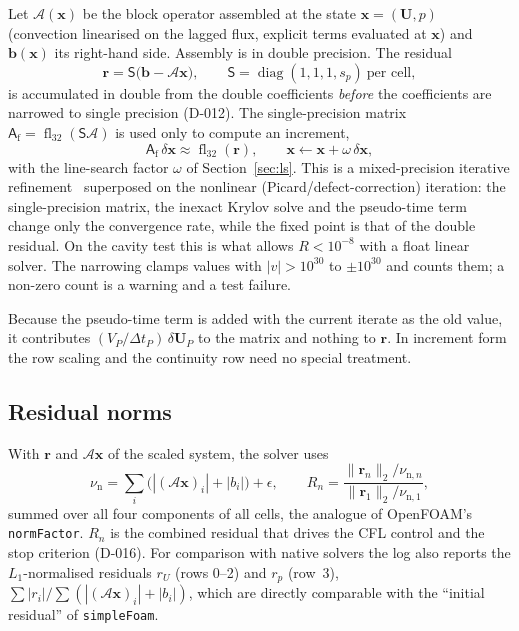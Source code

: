 \documentclass[11pt,a4paper]{article}
\newcommand{\vect}[1]{\mathbf{#1}}
\newcommand{\Uv}{\vect{U}}
\newcommand{\dt}{\Delta t}
\newcommand{\code}[1]{\texttt{#1}}
\begin{document}
Let $\mathcal{A}(\vect x)$ be the block operator assembled at the state
$\vect x=(\Uv,p)$ (convection linearised on the lagged flux, explicit terms
evaluated at $\vect x$) and $\vect b(\vect x)$ its right-hand side. Assembly
is in double precision. The residual
\begin{equation}
  \vect r = \mathsf{S}\bigl(\vect b-\mathcal{A}\vect x\bigr),\qquad
  \mathsf{S}=\operatorname{diag}(1,1,1,s_p)\ \text{per cell},
\end{equation}
is accumulated in double from the double coefficients \emph{before} the
coefficients are narrowed to single precision (D-012). The single-precision
matrix $\mathsf{A}_{\mathrm{f}}=\operatorname{fl}_{32}(\mathsf{S}\mathcal A)$
is used only to compute an increment,
\begin{equation}
  \mathsf{A}_{\mathrm{f}}\,\delta\vect x \approx \operatorname{fl}_{32}(\vect r),
  \qquad
  \vect x\leftarrow\vect x+\omega\,\delta\vect x,
  \label{eq:increment}
\end{equation}
with the line-search factor $\omega$ of Section~\ref{sec:ls}. This is a
mixed-precision iterative refinement~\cite{Baboulin2009,Carson2018}
superposed on the nonlinear (Picard/defect-correction) iteration: the
single-precision matrix, the inexact Krylov solve and the pseudo-time term
change only the convergence rate, while the fixed point is that of the double
residual. On the cavity test this is what allows $R<10^{-8}$ with a float
linear solver. The narrowing clamps values with $|v|>10^{30}$ to
$\pm10^{30}$ and counts them; a non-zero count is a warning and a test
failure.

Because the pseudo-time term is added with the current iterate as the old
value, it contributes $(V_P/\dt_P)\,\delta\Uv_P$ to the matrix and nothing to
$\vect r$. In increment form the row scaling and the continuity row need no
special treatment.

\subsection{Residual norms}\label{sec:norms}

With $\vect r$ and $\mathcal A\vect x$ of the scaled system, the solver uses
\begin{equation}
  \nu_{\mathrm{n}} = \sum_i\bigl(|(\mathcal A\vect x)_i|+|b_i|\bigr)+\epsilon,
  \qquad
  R_n = \frac{\|\vect r_n\|_2/\nu_{\mathrm{n},n}}{\|\vect r_1\|_2/\nu_{\mathrm{n},1}},
\end{equation}
summed over all four components of all cells, the analogue of OpenFOAM's
\code{normFactor}. $R_n$ is the combined residual that drives the CFL control
and the stop criterion (D-016). For comparison with native solvers the log
also reports the $L_1$-normalised residuals $r_U$ (rows 0--2) and $r_p$
(row~3), $\sum|r_i|/\sum(|(\mathcal A\vect x)_i|+|b_i|)$, which are
directly comparable with the ``initial residual'' of \code{simpleFoam}.
\end{document}
